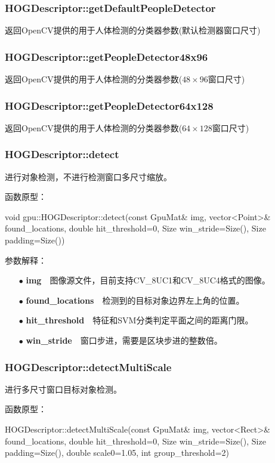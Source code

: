 \documentclass[10pt,technote,onecolumn,twoside]{IEEEtran}
\begin{document}
\subsubsection{HOGDescriptor::getDefaultPeopleDetector}
返回OpenCV提供的用于人体检测的分类器参数(默认检测器窗口尺寸)
\subsubsection{HOGDescriptor::getPeopleDetector48x96}
返回OpenCV提供的用于人体检测的分类器参数($48\times96$窗口尺寸)
\subsubsection{HOGDescriptor::getPeopleDetector64x128}
返回OpenCV提供的用于人体检测的分类器参数($64\times128$窗口尺寸)
\subsubsection{HOGDescriptor::detect}
进行对象检测，不进行检测窗口多尺寸缩放。

函数原型：

void gpu::HOGDescriptor::detect(const GpuMat\& img, vector<Point>\& found\_locations, double hit\_threshold=0, Size win\_stride=Size(), Size padding=Size())

参数解释：

\begin{enumerate}
\item[$\bullet$]\textbf{img}~~图像源文件，目前支持\textsf{CV\_8UC1}和\textsf{CV\_8UC4}格式的图像。
\item[$\bullet$]\textbf{found\_locations}~~检测到的目标对象边界左上角的位置。
\item[$\bullet$]\textbf{hit\_threshold}~~特征和SVM分类判定平面之间的距离门限。
\item[$\bullet$]\textbf{win\_stride}~~窗口步进，需要是区块步进的整数倍。
\end{enumerate}
\subsubsection{HOGDescriptor::detectMultiScale}
进行多尺寸窗口目标对象检测。

函数原型：

HOGDescriptor::detectMultiScale(const GpuMat\& img, vector<Rect>\& found\_locations, double hit\_threshold=0, Size win\_stride=Size(), Size padding=Size(), double scale0=1.05, int group\_threshold=2)
\end{document}
